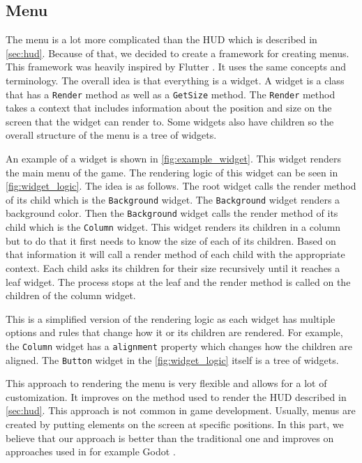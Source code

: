 \subsection{Menu} \label{subsec:menu}
The menu is a lot more complicated than the HUD which is described in \autoref{sec:hud}.
Because of that, we decided to create a framework for creating menus.
This framework was heavily inspired by Flutter \cite{flutter}.
It uses the same concepts and terminology.
The overall idea is that everything is a widget.
A widget is a class that has a \texttt{Render} method as well as a \texttt{GetSize} method.
The \texttt{Render} method takes a context that includes information about the position and size on the screen that the widget can render to.
Some widgets also have children so the overall structure of the menu is a tree of widgets.

An example of a widget is shown in \autoref{fig:example_widget}.
This widget renders the main menu of the game.
The rendering logic of this widget can be seen in \autoref{fig:widget_logic}.
The idea is as follows.
The root widget calls the render method of its child which is the \texttt{Background} widget.
The \texttt{Background} widget renders a background color.
Then the \texttt{Background} widget calls the render method of its child which is the \texttt{Column} widget.
This widget renders its children in a column but to do that it first needs to know the size of each of its children.
Based on that information it will call a render method of each child with the appropriate context.
Each child asks its children for their size recursively until it reaches a leaf widget.
The process stops at the leaf and the render method is called on the children of the column widget.

This is a simplified version of the rendering logic as each widget has multiple options and rules that change how it or its children are rendered.
For example, the \texttt{Column} widget has a \texttt{alignment} property which changes how the children are aligned.
The \texttt{Button} widget in the \autoref{fig:widget_logic} itself is a tree of widgets.

This approach to rendering the menu is very flexible and allows for a lot of customization.
It improves on the method used to render the HUD described in \autoref{sec:hud}.
This approach is not common in game development.
Usually, menus are created by putting elements on the screen at specific positions.
In this part, we believe that our approach is better than the traditional one and improves on approaches used in for example Godot \cite{Godot-Menu}.


